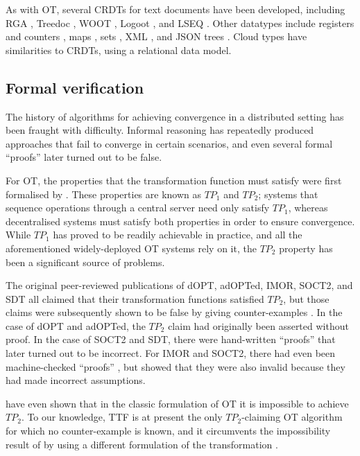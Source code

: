 As with OT, several CRDTs for text documents have been developed, including RGA \cite{Roh:2011dw}, Treedoc \cite{Preguica:2009fz}, WOOT \cite{Oster:2006wj}, Logoot \cite{Weiss:2010hx}, and LSEQ \cite{Nedelec:2013ky,Nedelec:2016eo}.
Other datatypes include registers and counters \cite{Shapiro:2011wy,Shapiro:2011un}, maps \cite{Baquero:2016iv}, sets \cite{Bieniusa:2012wu,Bieniusa:2012gt}, XML \cite{Martin:2010ih}, and JSON trees \cite{Kleppmann:2016ve}.
Cloud types \cite{Burckhardt:2012jy} have similarities to CRDTs, using a relational data model.


\subsection{Formal verification}\label{sect.related.verification}

The history of algorithms for achieving convergence in a distributed setting has been fraught with difficulty.
Informal reasoning has repeatedly produced approaches that fail to converge in certain scenarios, and even several formal ``proofs'' later turned out to be false.

For OT, the properties that the transformation function must satisfy were first formalised by \citet{Ressel:1996wx}.
These properties are known as $\mathit{TP}_1$ and $\mathit{TP}_2$; systems that sequence operations through a central server need only satisfy $\mathit{TP}_1$, whereas decentralised systems must satisfy both properties in order to ensure convergence.
While $\mathit{TP}_1$ has proved to be readily achievable in practice, and all the aforementioned widely-deployed OT systems rely on it, the $\mathit{TP}_2$ property has been a significant source of problems.

The original peer-reviewed publications of dOPT, adOPTed, IMOR, SOCT2, and SDT all claimed that their transformation functions satisfied $\mathit{TP}_2$, but those claims were subsequently shown to be false by giving counter-examples \cite{Imine:2003ks,Imine:2006kn,Oster:2005vi}.
In the case of dOPT and adOPTed, the $\mathit{TP}_2$ claim had originally been asserted without proof.
In the case of SOCT2 and SDT, there were hand-written ``proofs'' that later turned out to be incorrect.
For IMOR and SOCT2, there had even been machine-checked ``proofs'' \cite{Imine:2003ks}, but \citet{Oster:2005vi} showed that they were also invalid because they had made incorrect assumptions.

\citet{Randolph:2015gj} have even shown that in the classic formulation of OT it is impossible to
achieve $\mathit{TP}_2$. To our knowledge, TTF is at present the only $\mathit{TP}_2$-claiming OT
algorithm for which no counter-example is known, and it circumvents the impossibility result of
\citet{Randolph:2015gj} by using a different formulation of the transformation
\cite{Oster:2006tr,Levien:2016wz}.

